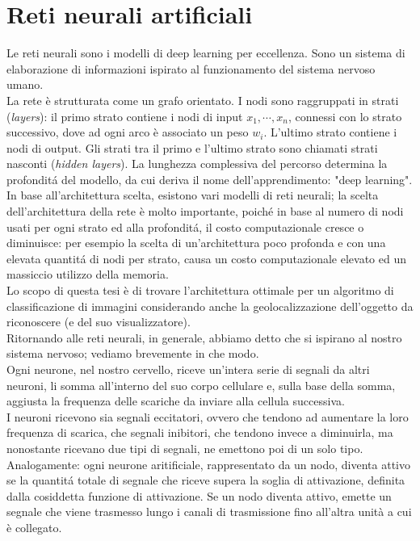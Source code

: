 \documentclass[a4paper,12pt,oneside]{book}
\begin{document}
\chapter{Reti neurali artificiali}
Le reti neurali sono i modelli di deep learning per eccellenza. Sono un sistema di elaborazione di informazioni ispirato al funzionamento del sistema nervoso umano.\\
La rete \`e strutturata come un grafo orientato. I nodi sono raggruppati in strati (\textit{layers}): il primo strato contiene i nodi di input  $x_1,\cdots,x_n$, connessi con lo strato successivo, dove ad ogni arco \`e associato un peso $w_i$. L'ultimo strato contiene i nodi di output. Gli strati tra il primo e l'ultimo strato sono chiamati strati nasconti (\textit{hidden layers}). La lunghezza complessiva del percorso determina la profondit\'{a} del modello, da cui deriva il nome dell'apprendimento: "deep learning".\\
In base all'architettura scelta, esistono vari modelli di  reti neurali;
la scelta dell'architettura della rete \`e molto importante, poich\'{e} in base al numero di nodi usati per ogni strato ed alla profondit\'{a}, il costo computazionale cresce o diminuisce: per esempio la scelta di un'architettura poco profonda e con una elevata quantit\'{a} di nodi per strato, causa un costo computazionale elevato ed un massiccio utilizzo della memoria.\\
Lo scopo di questa tesi \`e di trovare l'architettura ottimale per un algoritmo di classificazione di immagini considerando anche la geolocalizzazione dell'oggetto da riconoscere (e del suo visualizzatore). \\ %
Ritornando alle reti neurali, in generale, abbiamo detto che si ispirano al nostro sistema nervoso; vediamo brevemente in che modo.\\
Ogni neurone, nel nostro cervello, riceve un'intera serie di segnali da altri neuroni, li somma all'interno del suo corpo cellulare e, sulla base della somma, aggiusta la frequenza delle scariche da inviare alla cellula successiva.\\
I neuroni ricevono sia segnali eccitatori, ovvero che tendono ad aumentare la loro frequenza di scarica, che segnali inibitori, che tendono invece a diminuirla, ma nonostante ricevano due tipi di segnali, ne emettono poi di un solo tipo. Analogamente: ogni neurone aritificiale, rappresentato da un nodo, diventa attivo se la quantit\'{a} totale di segnale che riceve supera la soglia di attivazione, definita dalla cosiddetta funzione di attivazione. Se un nodo diventa attivo, emette un segnale che viene trasmesso lungo i canali di trasmissione fino all'altra unit\`{a} a cui \`e collegato.\\
\end{document}
